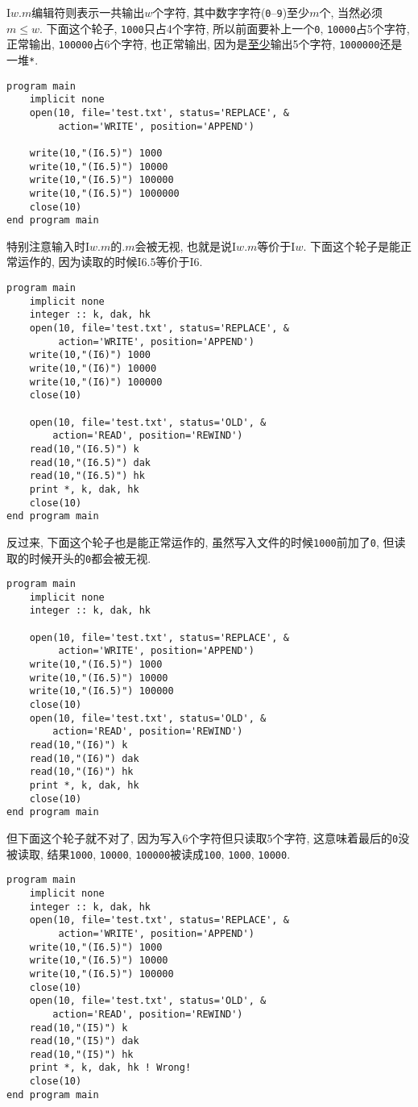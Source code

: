 I$w.m$编辑符则表示一共输出$w$个字符, 其中数字字符(\verb|0|--\verb|9|)至少$m$个, 当然必须$m\leqslant  w$. 下面这个轮子, \verb|1000|只占4个字符, 所以前面要补上一个\verb|0|, \verb|10000|占5个字符, 正常输出, \verb|100000|占6个字符, 也正常输出, 因为是\uline{至少}输出5个字符, \verb|1000000|还是一堆\verb|*|.
\begin{verbatim}
program main
    implicit none
    open(10, file='test.txt', status='REPLACE', &
         action='WRITE', position='APPEND')

    write(10,"(I6.5)") 1000
    write(10,"(I6.5)") 10000
    write(10,"(I6.5)") 100000
    write(10,"(I6.5)") 1000000
    close(10)
end program main
\end{verbatim}
特别注意输入时I$w.m$的$.m$会被无视, 也就是说I$w.m$等价于I$w$. 下面这个轮子是能正常运作的, 因为读取的时候I$6.5$等价于I$6$.
\begin{verbatim}
program main
    implicit none
    integer :: k, dak, hk
    open(10, file='test.txt', status='REPLACE', &
         action='WRITE', position='APPEND')
    write(10,"(I6)") 1000
    write(10,"(I6)") 10000
    write(10,"(I6)") 100000
    close(10)

    open(10, file='test.txt', status='OLD', &
        action='READ', position='REWIND')
    read(10,"(I6.5)") k
    read(10,"(I6.5)") dak
    read(10,"(I6.5)") hk
    print *, k, dak, hk
    close(10)
end program main
\end{verbatim}
反过来, 下面这个轮子也是能正常运作的, 虽然写入文件的时候\verb|1000|前加了\verb|0|, 但读取的时候开头的\verb|0|都会被无视.
\begin{verbatim}
program main
    implicit none
    integer :: k, dak, hk

    open(10, file='test.txt', status='REPLACE', &
         action='WRITE', position='APPEND')
    write(10,"(I6.5)") 1000
    write(10,"(I6.5)") 10000
    write(10,"(I6.5)") 100000
    close(10)
    open(10, file='test.txt', status='OLD', &
        action='READ', position='REWIND')
    read(10,"(I6)") k
    read(10,"(I6)") dak
    read(10,"(I6)") hk
    print *, k, dak, hk
    close(10)
end program main
\end{verbatim}
但下面这个轮子就不对了, 因为写入6个字符但只读取5个字符, 这意味着最后的\verb|0|没被读取, 结果\verb|1000|, \verb|10000|, \verb|100000|被读成\verb|100|, \verb|1000|, \verb|10000|.
\begin{verbatim}
program main
    implicit none
    integer :: k, dak, hk
    open(10, file='test.txt', status='REPLACE', &
         action='WRITE', position='APPEND')
    write(10,"(I6.5)") 1000
    write(10,"(I6.5)") 10000
    write(10,"(I6.5)") 100000
    close(10)
    open(10, file='test.txt', status='OLD', &
        action='READ', position='REWIND')
    read(10,"(I5)") k
    read(10,"(I5)") dak
    read(10,"(I5)") hk
    print *, k, dak, hk ! Wrong!
    close(10)
end program main
\end{verbatim}

